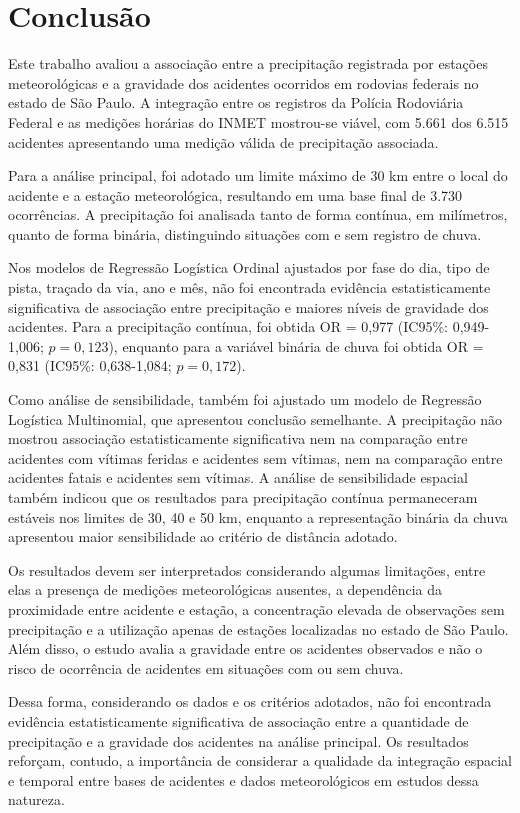 \documentclass[12pt]{article}
\begin{document}
\section{Conclusão}
\label{sec:conclusao}

Este trabalho avaliou a associação entre a precipitação registrada por
estações meteorológicas e a gravidade dos acidentes ocorridos em rodovias
federais no estado de São Paulo. A integração entre os registros da Polícia
Rodoviária Federal e as medições horárias do INMET mostrou-se viável, com
5.661 dos 6.515 acidentes apresentando uma medição válida de precipitação
associada.

Para a análise principal, foi adotado um limite máximo de 30 km entre o
local do acidente e a estação meteorológica, resultando em uma base final
de 3.730 ocorrências. A precipitação foi analisada tanto de forma contínua,
em milímetros, quanto de forma binária, distinguindo situações com e sem
registro de chuva.

Nos modelos de Regressão Logística Ordinal ajustados por fase do dia, tipo
de pista, traçado da via, ano e mês, não foi encontrada evidência
estatisticamente significativa de associação entre precipitação e maiores
níveis de gravidade dos acidentes. Para a precipitação contínua, foi obtida
OR = 0,977 (IC95\%: 0,949-1,006; $p = 0,123$), enquanto para a variável
binária de chuva foi obtida OR = 0,831 (IC95\%: 0,638-1,084; $p = 0,172$).

Como análise de sensibilidade, também foi ajustado um modelo de Regressão
Logística Multinomial, que apresentou conclusão semelhante. A precipitação
não mostrou associação estatisticamente significativa nem na comparação
entre acidentes com vítimas feridas e acidentes sem vítimas, nem na
comparação entre acidentes fatais e acidentes sem vítimas. A análise de
sensibilidade espacial também indicou que os resultados para precipitação
contínua permaneceram estáveis nos limites de 30, 40 e 50 km, enquanto a
representação binária da chuva apresentou maior sensibilidade ao critério
de distância adotado.

Os resultados devem ser interpretados considerando algumas limitações,
entre elas a presença de medições meteorológicas ausentes, a dependência
da proximidade entre acidente e estação, a concentração elevada de
observações sem precipitação e a utilização apenas de estações localizadas
no estado de São Paulo. Além disso, o estudo avalia a gravidade entre os
acidentes observados e não o risco de ocorrência de acidentes em situações
com ou sem chuva.

Dessa forma, considerando os dados e os critérios adotados, não foi
encontrada evidência estatisticamente significativa de associação entre
a quantidade de precipitação e a gravidade dos acidentes na análise
principal. Os resultados reforçam, contudo, a importância de considerar
a qualidade da integração espacial e temporal entre bases de acidentes e
dados meteorológicos em estudos dessa natureza.



\end{document}
